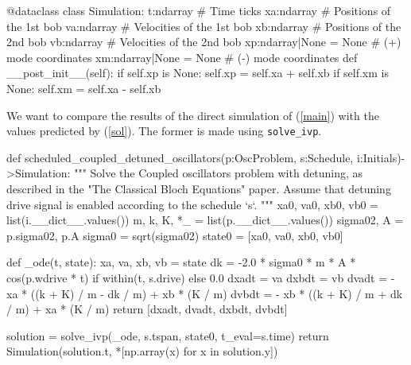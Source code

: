   \begin{python}
  @dataclass
  class Simulation:
    t:ndarray                # Time ticks
    xa:ndarray               # Positions of the 1st bob
    va:ndarray               # Velocities of the 1st bob
    xb:ndarray               # Positions of the 2nd bob
    vb:ndarray               # Velocities of the 2nd bob
    xp:ndarray|None = None   # (+) mode coordinates
    xm:ndarray|None = None   # (-) mode coordinates
    def __post_init__(self):
      if self.xp is None:
        self.xp = self.xa + self.xb
      if self.xm is None:
        self.xm = self.xa - self.xb
  \end{python}

We want to compare the results of the direct simulation of (\ref{main}) with the values predicted by
(\ref{sol}). The former is made using \verb|solve_ivp|.

  \begin{python}
  def scheduled_coupled_detuned_oscillators(p:OscProblem, s:Schedule, i:Initials)->Simulation:
    """ Solve the Coupled oscillators problem with detuning, as described in the "The Classical Bloch
    Equations" paper. Assume that detuning drive signal is enabled according to the schedule `s`.
    """
    xa0, va0, xb0, vb0 = list(i.__dict__.values())
    m, k, K, *_ = list(p.__dict__.values())
    sigma02, A = p.sigma02, p.A
    sigma0 = sqrt(sigma02)
    state0 = [xa0, va0, xb0, vb0]
  
    def _ode(t, state):
      xa, va, xb, vb = state
      dk = -2.0 * sigma0 * m * A * cos(p.wdrive * t) if within(t, s.drive) else 0.0
      dxadt = va
      dxbdt = vb
      dvadt = - xa * ((k + K) / m - dk / m) + xb * (K / m)
      dvbdt = - xb * ((k + K) / m + dk / m) + xa * (K / m)
      return [dxadt, dvadt, dxbdt, dvbdt]
  
    solution = solve_ivp(_ode, s.tspan, state0, t_eval=s.time)
    return Simulation(solution.t, *[np.array(x) for x in solution.y])
  \end{python}

